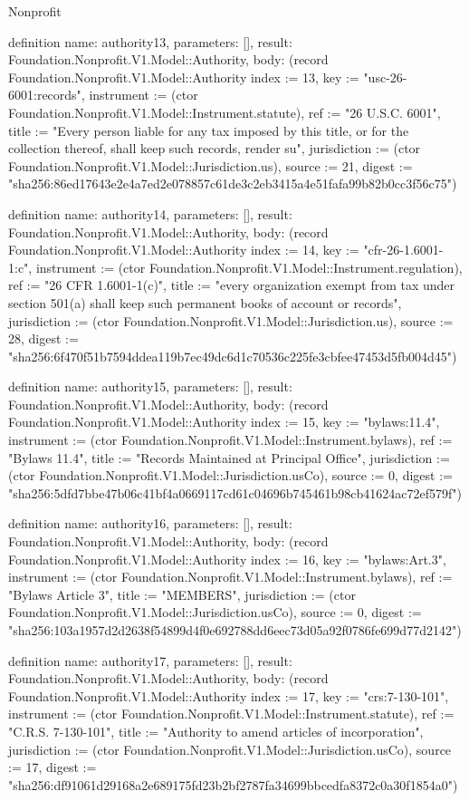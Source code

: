 \begin{lexlean}{Nonprofit}
\begin{semanticmodule}
definition{
  name: authority13,
  parameters: [],
  result: Foundation.Nonprofit.V1.Model::Authority,
  body: (record Foundation.Nonprofit.V1.Model::Authority {index := 13, key := "usc-26-6001:records", instrument := (ctor Foundation.Nonprofit.V1.Model::Instrument.statute), ref := "26 U.S.C. 6001", title := "Every person liable for any tax imposed by this title, or for the collection thereof, shall keep such records, render su", jurisdiction := (ctor Foundation.Nonprofit.V1.Model::Jurisdiction.us), source := 21, digest := "sha256:86ed17643e2e4a7ed2e078857c61de3c2eb3415a4e51fafa99b82b0cc3f56c75"})
}

definition{
  name: authority14,
  parameters: [],
  result: Foundation.Nonprofit.V1.Model::Authority,
  body: (record Foundation.Nonprofit.V1.Model::Authority {index := 14, key := "cfr-26-1.6001-1:c", instrument := (ctor Foundation.Nonprofit.V1.Model::Instrument.regulation), ref := "26 CFR 1.6001-1(c)", title := "every organization exempt from tax under section 501(a) shall keep such permanent books of account or records", jurisdiction := (ctor Foundation.Nonprofit.V1.Model::Jurisdiction.us), source := 28, digest := "sha256:6f470f51b7594ddea119b7ec49dc6d1c70536c225fe3cbfee47453d5fb004d45"})
}

definition{
  name: authority15,
  parameters: [],
  result: Foundation.Nonprofit.V1.Model::Authority,
  body: (record Foundation.Nonprofit.V1.Model::Authority {index := 15, key := "bylaws:11.4", instrument := (ctor Foundation.Nonprofit.V1.Model::Instrument.bylaws), ref := "Bylaws 11.4", title := "Records Maintained at Principal Office", jurisdiction := (ctor Foundation.Nonprofit.V1.Model::Jurisdiction.usCo), source := 0, digest := "sha256:5dfd7bbe47b06c41bf4a0669117cd61c04696b745461b98cb41624ac72ef579f"})
}

definition{
  name: authority16,
  parameters: [],
  result: Foundation.Nonprofit.V1.Model::Authority,
  body: (record Foundation.Nonprofit.V1.Model::Authority {index := 16, key := "bylaws:Art.3", instrument := (ctor Foundation.Nonprofit.V1.Model::Instrument.bylaws), ref := "Bylaws Article 3", title := "MEMBERS", jurisdiction := (ctor Foundation.Nonprofit.V1.Model::Jurisdiction.usCo), source := 0, digest := "sha256:103a1957d2d2638f54899d4f0e692788dd6eec73d05a92f0786fe699d77d2142"})
}

definition{
  name: authority17,
  parameters: [],
  result: Foundation.Nonprofit.V1.Model::Authority,
  body: (record Foundation.Nonprofit.V1.Model::Authority {index := 17, key := "crs:7-130-101", instrument := (ctor Foundation.Nonprofit.V1.Model::Instrument.statute), ref := "C.R.S. 7-130-101", title := "Authority to amend articles of incorporation", jurisdiction := (ctor Foundation.Nonprofit.V1.Model::Jurisdiction.usCo), source := 17, digest := "sha256:df91061d29168a2e689175fd23b2bf2787fa34699bbcedfa8372c0a30f1854a0"})
}


\end{semanticmodule}
\end{lexlean}
